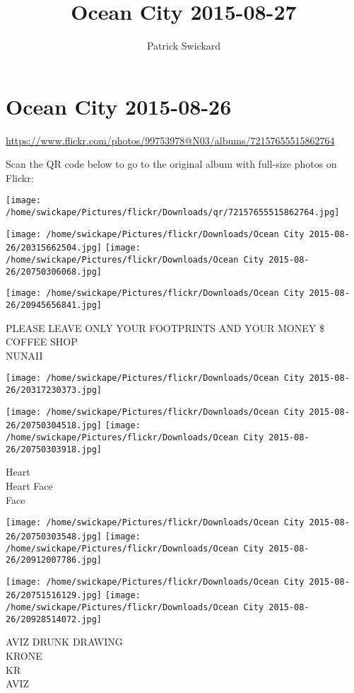 \documentclass[10pt,letterpaper]{article}
\title{Ocean City 2015-08-27}
\author{Patrick Swickard}
\date{}
\begin{document}
\section*{Ocean City 2015-08-26}

\url{https://www.flickr.com/photos/99753978@N03/albums/72157655515862764}

Scan the QR code below to go to the original album with full-size photos on Flickr:

\texttt{[image: /home/swickape/Pictures/flickr/Downloads/qr/72157655515862764.jpg]}
\pagebreak

\texttt{[image: /home/swickape/Pictures/flickr/Downloads/Ocean City 2015-08-26/20315662504.jpg]}
\texttt{[image: /home/swickape/Pictures/flickr/Downloads/Ocean City 2015-08-26/20750306068.jpg]}

\texttt{[image: /home/swickape/Pictures/flickr/Downloads/Ocean City 2015-08-26/20945656841.jpg]}

PLEASE LEAVE ONLY YOUR FOOTPRINTS AND YOUR MONEY \$\\
COFFEE SHOP\\
NUNAII
\pagebreak

\texttt{[image: /home/swickape/Pictures/flickr/Downloads/Ocean City 2015-08-26/20317230373.jpg]}

\vspace{0.25in}
\texttt{[image: /home/swickape/Pictures/flickr/Downloads/Ocean City 2015-08-26/20750304518.jpg]}
\texttt{[image: /home/swickape/Pictures/flickr/Downloads/Ocean City 2015-08-26/20750303918.jpg]}

Heart\\
Heart Face\\
Face
\pagebreak

\texttt{[image: /home/swickape/Pictures/flickr/Downloads/Ocean City 2015-08-26/20750303548.jpg]}
\texttt{[image: /home/swickape/Pictures/flickr/Downloads/Ocean City 2015-08-26/20912007786.jpg]}

\texttt{[image: /home/swickape/Pictures/flickr/Downloads/Ocean City 2015-08-26/20751516129.jpg]}
\texttt{[image: /home/swickape/Pictures/flickr/Downloads/Ocean City 2015-08-26/20928514072.jpg]}

AVIZ DRUNK DRAWING\\
KRONE\\
KR\\
AVIZ
\pagebreak
\end{document}
